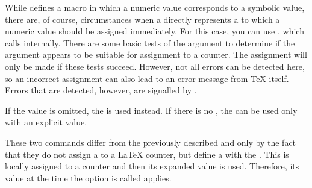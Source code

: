 \begin{Declaration}
\end{Declaration}
While
 defines a macro in which a numeric
value corresponds to a symbolic value, there are, of course, circumstances
when a  directly represents a  to which a
numeric value should be assigned immediately. For this case, you can use
, which calls  internally.
There are some basic tests of the  argument to determine if the
 argument appears to be suitable for assignment to a counter. The
assignment will only be made if these tests succeed. However, not all errors
can be detected here, so an incorrect assignment can also lead to an error
message from \TeX{} itself. Errors that are detected, however, are signalled
by .

If the value is omitted, the
 is used instead. If there is no , the
 can be used only with an explicit value.%
\EndIndexGroup


\begin{Declaration}
\end{Declaration}
These two commands differ from the
previously described  and
 only by the fact that they do not
assign a  to a \LaTeX{} counter, but define a  with
the . This  is locally assigned to a counter and
then its expanded value is used. Therefore, its value at the time the option
is called applies.%
\EndIndexGroup


